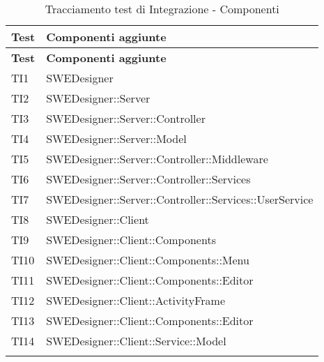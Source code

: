 \begin{longtable}{p{2cm}!{\VRule[1pt]}p{10cm}}
\color{white} \textbf{Test} & \color{white} \textbf{Componenti aggiunte} \\ 
\endfirsthead 
{} 
\color{white} \textbf{Test} & \color{white} \textbf{Componenti aggiunte} \\ 
\endhead 
TI1 & SWEDesigner \\

TI2 & SWEDesigner::Server\\

TI3 & SWEDesigner::Server::Controller\\

TI4 & SWEDesigner::Server::Model \\

TI5 & SWEDesigner::Server::Controller::Middleware \\

TI6 & SWEDesigner::Server::Controller::Services \\

TI7 & SWEDesigner::Server::Controller::Services::UserService\\

TI8 & SWEDesigner::Client\\

TI9 & SWEDesigner::Client::Components\\

TI10 & SWEDesigner::Client::Components::Menu \\

TI11 & SWEDesigner::Client::Components::Editor \\

TI12 & SWEDesigner::Client::ActivityFrame\\

TI13 & SWEDesigner::Client::Components::Editor\\

TI14 & SWEDesigner::Client::Service::Model\\

\caption{Tracciamento test di Integrazione - Componenti}
\end{longtable}



\newpage
